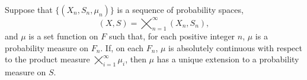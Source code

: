 Suppose that $\{(X_n, S_n, \mu_n)\}$ is a sequence of probability spaces,
$$(X, S) = \bigtimes_{n=1}^{\infty}(X_n, S_n),$$
and $\mu$ is a set function on $F$ such that, for each positive integer $n$, $\mu$ is a probability measure on $F_n$. If, on each $F_n$, $\mu$ is absolutely continuous with respect to the product measure $\bigtimes_{i=1}^{\infty} \mu_i$, then $\mu$ has a unique extension to a probability measure on $S$.
